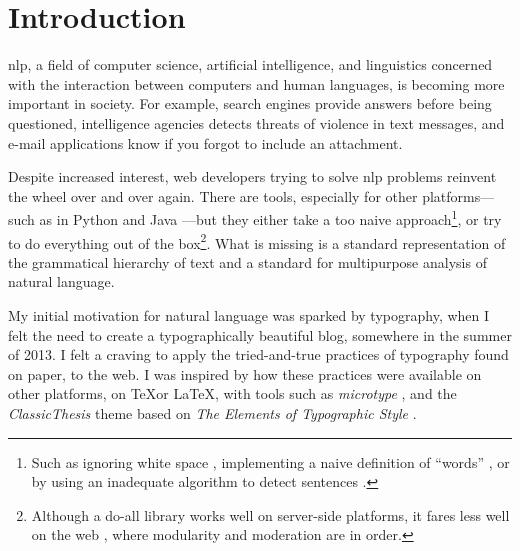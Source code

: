 
\begingroup
\let\clearpage\relax
\let\cleardoublepage\relax
\let\cleardoublepage\relax

\chapter*{Introduction}

\Gls{nlp}, a field of computer science, artificial intelligence, and
  linguistics concerned with the interaction between computers and human
  languages, is becoming more important in society.
For example, search engines provide answers before being questioned,
  intelligence agencies detects threats of violence in text messages, and
  e-mail applications know if you forgot to include an attachment.

Despite increased interest, web developers trying to solve \gls{nlp} problems
reinvent the wheel over and over again. There are tools,
especially for other platforms---such as in Python
\autocite{nltk-source} and Java \autocite{opennlp-source}---but they either
take a too naive approach\footnote{Such as ignoring white space
  \autocite{loadfive/knwl-source-code}, implementing a naive
  definition of ``words'' \autocite{nhunzaker/speakeasy-source-code},
  or by using an inadequate algorithm to detect sentences
  \autocite[][]{nytimes/emphasis-source-code}.}, or try to do everything out
of the box\footnote{Although a do-all library works well on server-side
  platforms, it fares less well on the web \autocite[such
  as][]{NaturalNode/natural-source-code}, where modularity and moderation
  are in order.}. What is missing is a standard representation of the
grammatical hierarchy of text and a standard for multipurpose analysis of
natural language.

My initial motivation for natural language was sparked by typography, when I
  felt the need to create a typographically beautiful blog, somewhere in the
  summer of 2013.
I felt a craving to apply the tried-and-true practices of typography found on
  paper, to the web.
I was inspired by how these practices were available on other platforms,
  on \TeX or \LaTeX, with tools such as \emph{microtype} \autocite{microtype},
  and the \emph{ClassicThesis} theme \autocite{classicthesis} based on
  \emph{The Elements of Typographic Style}
  \autocite{bringhurst-element-typographic-style}.

